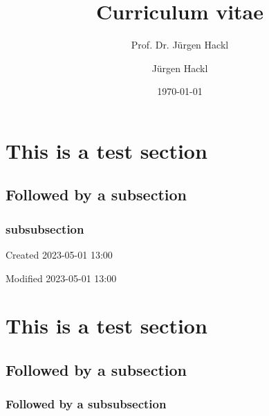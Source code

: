 \documentclass[
11pt,
titleformat=cv,
]{princeton}
\author{Jürgen Hackl}
\date{\today}
\title{Curriculum vitae}
\subtitle{Prof. Dr. Jürgen Hackl}
\begin{document}
\maketitle



\blindtext

\section{This is a test section}

\blindtext

\subsection{Followed by a subsection}
\subsubsection{subsubsection}

\begin{margindescription}
\item[Created] 2023-05-01 13:00
\item[Modified] 2023-05-01 13:00
\end{margindescription}

\blindtext
\blindtext
\blindtext
\blindtext
\blindtext

\section{This is a test section}
\subsection{Followed by a subsection}
\subsubsection{Followed by a subsubsection}
\end{document}
